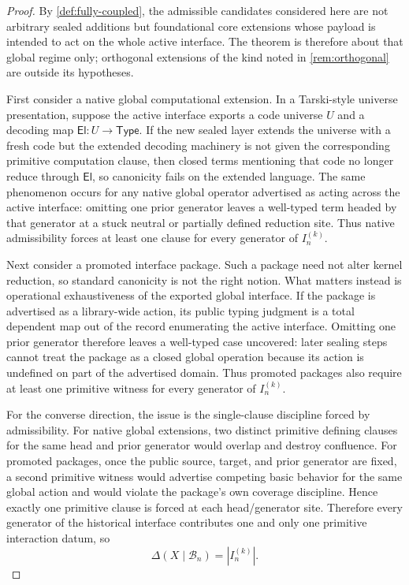 \documentclass{lmcs}
\newcommand{\B}{\mathcal{B}}
\begin{document}
\begin{proof}
By \autoref{def:fully-coupled}, the admissible candidates considered here are not arbitrary sealed additions but foundational core extensions whose payload is intended to act on the whole active interface. The theorem is therefore about that global regime only; orthogonal extensions of the kind noted in \autoref{rem:orthogonal} are outside its hypotheses.

First consider a native global computational extension. In a Tarski-style universe presentation, suppose the active interface exports a code universe $U$ and a decoding map $\mathsf{El} : U \to \mathsf{Type}$. If the new sealed layer extends the universe with a fresh code but the extended decoding machinery is not given the corresponding primitive computation clause, then closed terms mentioning that code no longer reduce through $\mathsf{El}$, so canonicity fails on the extended language. The same phenomenon occurs for any native global operator advertised as acting across the active interface: omitting one prior generator leaves a well-typed term headed by that generator at a stuck neutral or partially defined reduction site. Thus native admissibility forces at least one clause for every generator of $I_n^{(k)}$.

Next consider a promoted interface package. Such a package need not alter kernel reduction, so standard canonicity is not the right notion. What matters instead is operational exhaustiveness of the exported global interface. If the package is advertised as a library-wide action, its public typing judgment is a total dependent map out of the record enumerating the active interface. Omitting one prior generator therefore leaves a well-typed case uncovered: later sealing steps cannot treat the package as a closed global operation because its action is undefined on part of the advertised domain. Thus promoted packages also require at least one primitive witness for every generator of $I_n^{(k)}$.

For the converse direction, the issue is the single-clause discipline forced by admissibility. For native global extensions, two distinct primitive defining clauses for the same head and prior generator would overlap and destroy confluence. For promoted packages, once the public source, target, and prior generator are fixed, a second primitive witness would advertise competing basic behavior for the same global action and would violate the package's own coverage discipline. Hence exactly one primitive clause is forced at each head/generator site. Therefore every generator of the historical interface contributes one and only one primitive interaction datum, so
\[
  \Delta(X \mid \B_n) = |I_n^{(k)}|.
\]
\end{proof}
\end{document}
